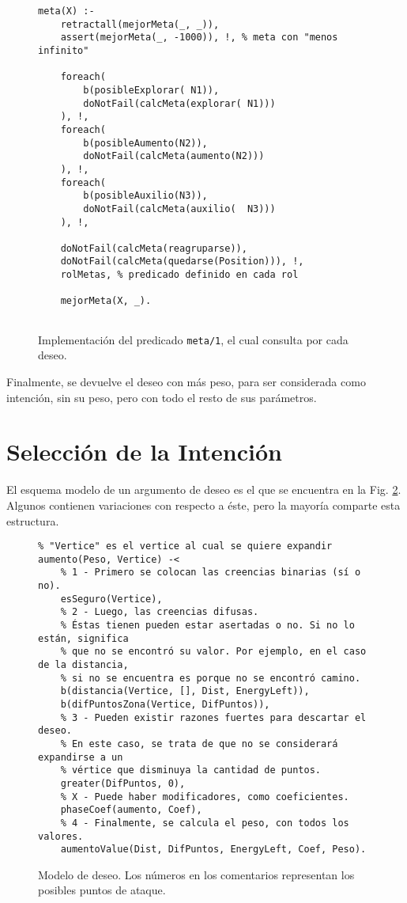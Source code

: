 \documentclass[oneside]{book}
\begin{document}
\begin{figure}
\begin{verbatim}
meta(X) :- 
    retractall(mejorMeta(_, _)),
    assert(mejorMeta(_, -1000)), !, % meta con "menos infinito"
    
    foreach(
        b(posibleExplorar( N1)), 
        doNotFail(calcMeta(explorar( N1)))
    ), !,
    foreach(
        b(posibleAumento(N2)), 
        doNotFail(calcMeta(aumento(N2)))
    ), !, 
    foreach(
        b(posibleAuxilio(N3)), 
        doNotFail(calcMeta(auxilio(  N3)))
    ), !,
    
	doNotFail(calcMeta(reagruparse)),
    doNotFail(calcMeta(quedarse(Position))), !,
    rolMetas, % predicado definido en cada rol
    
    mejorMeta(X, _).
    
\end{verbatim}
\caption{Implementación del predicado \texttt{meta/1}, el cual consulta por cada 
deseo.}
\label{fig:interfazProlog}
\end{figure}

Finalmente, se devuelve el deseo con más peso, para ser considerada como intención,
sin su peso, pero con todo el resto de sus parámetros. %


\section{Selección de la Intención}

El esquema modelo de un argumento de deseo es el que se encuentra en la Fig. 
\ref{fig:modeloArgumento}. Algunos contienen variaciones con respecto a éste, pero
la mayoría comparte esta estructura.

\begin{figure}
\begin{verbatim}
% "Vertice" es el vertice al cual se quiere expandir
aumento(Peso, Vertice) -< 
    % 1 - Primero se colocan las creencias binarias (sí o no).
    esSeguro(Vertice), 
    % 2 - Luego, las creencias difusas.
    % Éstas tienen pueden estar asertadas o no. Si no lo están, significa
    % que no se encontró su valor. Por ejemplo, en el caso de la distancia,
    % si no se encuentra es porque no se encontró camino.
    b(distancia(Vertice, [], Dist, EnergyLeft)),
    b(difPuntosZona(Vertice, DifPuntos)),
    % 3 - Pueden existir razones fuertes para descartar el deseo.
    % En este caso, se trata de que no se considerará expandirse a un 
    % vértice que disminuya la cantidad de puntos.
    greater(DifPuntos, 0),
    % X - Puede haber modificadores, como coeficientes.
    phaseCoef(aumento, Coef),
    % 4 - Finalmente, se calcula el peso, con todos los valores.
    aumentoValue(Dist, DifPuntos, EnergyLeft, Coef, Peso).
\end{verbatim}
\caption{Modelo de deseo. Los números en los comentarios representan los posibles 
puntos de ataque.}
\label{fig:modeloArgumento}
\end{figure}
\end{document}
